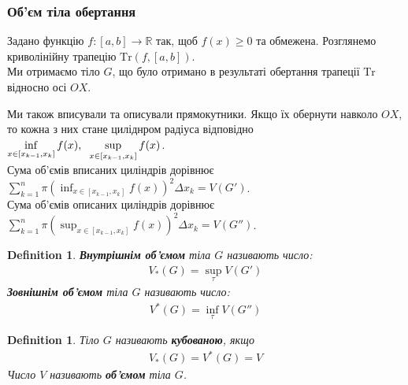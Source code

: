 \documentclass[a4paper, 10pt]{article}
\def\huge{\displaystyle}
\theoremstyle{theoremdd}
\theoremstyle{theoremdd}
\theoremstyle{theoremdd}
\newtheorem{definition}[theorem]{Definition}
\theoremstyle{theoremdd}
\theoremstyle{theoremdd}
\theoremstyle{theoremdd}
\theoremstyle{theoremdd}
\theoremstyle{theoremdd}
\theoremstyle{theoremdd}
\begin{document}
\subsubsection{Об'єм тіла обертання}
Задано функцію $f \colon [a,b] \to \mathbb{R}$ так, щоб $f(x) \geq 0$ та обмежена. Розглянемо криволінійну трапецію $\text{Tr}(f,[a,b])$.\\
Ми отримаємо тіло $G$, що було отримано в результаті обертання трапеції $\text{Tr}$ відносно осі $OX$.
\begin{figure}[H]
\centering
{}
\qquad
{}
\end{figure}
Ми також вписували та описували прямокутники. Якщо їх обернути навколо $OX$, то кожна з них стане циліднром радіуса відповідно $\huge\inf_{x \in [x_{k-1},x_k]} f(x), \hspace{0.2cm} \huge\sup_{x \in [x_{k-1},x_k]} f(x)$.\\
Сума об'ємів вписаних циліндрів дорівнює $\huge\sum_{k=1}^n \pi \left( \huge\inf_{x \in [x_{k-1},x_k]} f(x) \right)^2 \Delta x_k = V(G')$.\\
Сума об'ємів описаних циліндрів дорівнює $\huge\sum_{k=1}^n \pi \left( \huge\sup_{x \in [x_{k-1},x_k]} f(x) \right)^2 \Delta x_k = V(G'')$.

\begin{definition}
\textbf{Внутрішнім об'ємом} тіла $G$ називають число:
\begin{align*}
V_*(G) = \huge\sup_{\tau} V(G')
\end{align*}
\textbf{Зовнішнім об'ємом} тіла $G$ називають число:
\begin{align*}
V^*(G) = \huge\inf_{\tau} V(G'')
\end{align*}
\end{definition}

\begin{definition}
Тіло $G$ називають \textbf{кубованою}, якщо
\begin{align*}
V_*(G) = V^*(G) = V
\end{align*}
Число $V$ називають \textbf{об'ємом} тіла $G$.
\end{definition}
\end{document}
